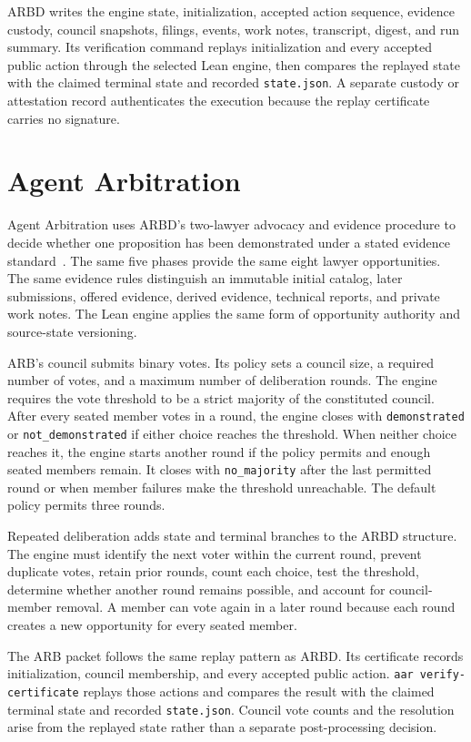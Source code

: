 \documentclass[11pt]{article}
\newcommand{\code}[1]{\texttt{#1}}
\begin{document}
ARBD writes the engine state, initialization, accepted action sequence, evidence custody, council snapshots, filings, events, work notes, transcript, digest, and run summary.  Its verification command replays initialization and every accepted public action through the selected Lean engine, then compares the replayed state with the claimed terminal state and recorded \code{state.json}.  A separate custody or attestation record authenticates the execution because the replay certificate carries no signature.

\section{Agent Arbitration}

Agent Arbitration uses ARBD's two-lawyer advocacy and evidence procedure to decide whether one proposition has been demonstrated under a stated evidence standard~\cite{manuals}.  The same five phases provide the same eight lawyer opportunities.  The same evidence rules distinguish an immutable initial catalog, later submissions, offered evidence, derived evidence, technical reports, and private work notes.  The Lean engine applies the same form of opportunity authority and source-state versioning.

ARB's council submits binary votes.  Its policy sets a council size, a required number of votes, and a maximum number of deliberation rounds.  The engine requires the vote threshold to be a strict majority of the constituted council.  After every seated member votes in a round, the engine closes with \code{demonstrated} or \code{not\_demonstrated} if either choice reaches the threshold.  When neither choice reaches it, the engine starts another round if the policy permits and enough seated members remain.  It closes with \code{no\_majority} after the last permitted round or when member failures make the threshold unreachable.  The default policy permits three rounds.

Repeated deliberation adds state and terminal branches to the ARBD structure.  The engine must identify the next voter within the current round, prevent duplicate votes, retain prior rounds, count each choice, test the threshold, determine whether another round remains possible, and account for council-member removal.  A member can vote again in a later round because each round creates a new opportunity for every seated member.

The ARB packet follows the same replay pattern as ARBD.  Its certificate records initialization, council membership, and every accepted public action.  \code{aar verify-certificate} replays those actions and compares the result with the claimed terminal state and recorded \code{state.json}.  Council vote counts and the resolution arise from the replayed state rather than a separate post-processing decision.
\end{document}
